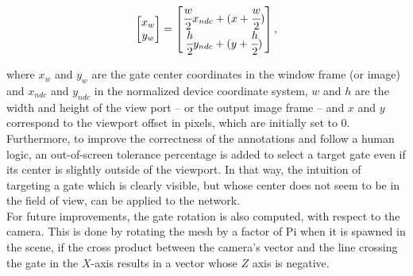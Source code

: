 \begin{equation}
	\begin{bmatrix}
		x_w\\y_w
	\end{bmatrix}
	=
	\begin{bmatrix}
		\cfrac{w}{2} x_{ndc} + (x + \cfrac{w}{2})\\
		\cfrac{h}{2} y_{ndc} + (y + \cfrac{h}{2})\\
	\end{bmatrix},
\end{equation}

where $x_w$ and $y_w$ are the gate center coordinates in the window
frame (or image) and $x_{ndc}$ and $y_{ndc}$ in the normalized device
coordinate system, $w$ and $h$ are the width and height of the view port -- or
the output image frame -- and $x$ and $y$ correspond to the viewport offset in
pixels, which are initially set to 0.\\

Furthermore, to improve the correctness of the annotations and follow a human
logic, an out-of-screen tolerance percentage is added to select a target gate
even if its center is slightly outside of the viewport. In that way, the
intuition of targeting a gate which is clearly visible, but whose center does
not seem to be in the field of view, can be applied to the network.\\

For future improvements, the gate rotation is also computed, with respect to
the camera. This is done by rotating the mesh by a factor of Pi when it is
spawned in the scene, if the cross product between the camera's vector and the
line crossing the gate in the $X$-axis results in a vector whose $Z$ axis is
negative.
